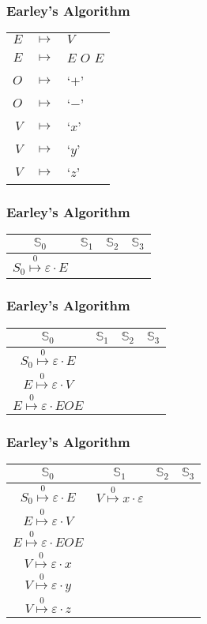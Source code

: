 \documentclass{beamer}
\newcommand{\earley}[4]{#1\overset{#4}{\mapsto}#2\cdot#3}
\newcommand{\St}[1]{\mathbb{S}_{#1}}
\begin{document}
	\begin{frame}
		\frametitle{Earley's Algorithm}
		\centering
		\begin{tabular}{rcl}
			$E$ & $ \mapsto $ & $V$ \\
			$E$ & $ \mapsto $ & $E$ $O$ $E$ \\
			$O$ & $ \mapsto $ & `$+$' \\
			$O$ & $ \mapsto $ & `$-$' \\
			$V$ & $ \mapsto $ & `$x$' \\
			$V$ & $ \mapsto $ & `$y$' \\
			$V$ & $ \mapsto $ & `$z$'
		\end{tabular}
	\end{frame}

	\begin{frame}
		\frametitle{Earley's Algorithm}
		\centering
		\begin{tabular}{|c|c|c|c|}
			\hline
			$\St{0}$ & $\St{1}$ & $\St{2}$ & $\St{3}$ \\
			\hline
			$\earley{S_0}{\varepsilon}{E}{0}$ & & & \\
			\hline
		\end{tabular}
	\end{frame}

	\begin{frame}
		\frametitle{Earley's Algorithm}
		\centering
		\begin{tabular}{|c|c|c|c|}
			\hline
			$\St{0}$ & $\St{1}$ & $\St{2}$ & $\St{3}$ \\
			\hline
			$\earley{S_0}{\varepsilon}{E}{0}$ & & & \\
			$\earley{E}{\varepsilon}{V}{0}$   & & & \\
			$\earley{E}{\varepsilon}{EOE}{0}$ & & & \\
			\hline
		\end{tabular}
	\end{frame}

	\begin{frame}
		\frametitle{Earley's Algorithm}
		\centering
		\begin{tabular}{|c|c|c|c|}
			\hline
			$\St{0}$                          & $\St{1}$ & $\St{2}$ & $\St{3}$ \\
			\hline
			$\earley{S_0}{\varepsilon}{E}{0}$ & $\earley{V}{x}{\varepsilon}{0}$ & &\\
			$\earley{E}{\varepsilon}{V}{0}$   & & & \\
			$\earley{E}{\varepsilon}{EOE}{0}$ & & & \\
			$\earley{V}{\varepsilon}{x}{0}$   & & & \\
			$\earley{V}{\varepsilon}{y}{0}$   & & & \\
			$\earley{V}{\varepsilon}{z}{0}$   & & & \\
			\hline
		\end{tabular}
	\end{frame}
\end{document}
